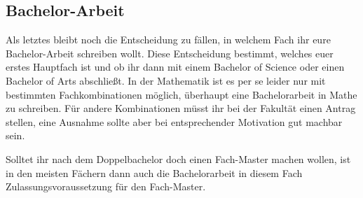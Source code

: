 \subsection{Bachelor-Arbeit}

Als letztes bleibt noch die Entscheidung zu fällen, in welchem Fach ihr eure Bachelor-Arbeit schreiben wollt. Diese Entscheidung bestimmt, welches euer erstes Hauptfach ist und ob ihr dann mit einem Bachelor of Science oder einen Bachelor of Arts abschließt. In der Mathematik ist es per se leider nur mit bestimmten Fachkombinationen möglich, überhaupt eine Bachelorarbeit in Mathe zu schreiben. Für andere Kombinationen müsst ihr bei der Fakultät einen Antrag stellen, eine Ausnahme sollte aber bei entsprechender Motivation gut machbar sein.

Solltet ihr nach dem Doppelbachelor doch einen Fach-Master machen wollen, ist in den meisten Fächern dann auch die Bachelorarbeit in diesem Fach Zulassungsvoraussetzung für den Fach-Master.